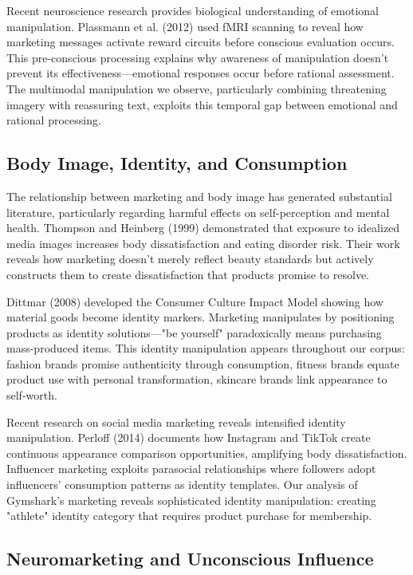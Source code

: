 Recent neuroscience research provides biological understanding of emotional manipulation. Plassmann et al. (2012) used fMRI scanning to reveal how marketing messages activate reward circuits before conscious evaluation occurs. This pre-conscious processing explains why awareness of manipulation doesn't prevent its effectiveness—emotional responses occur before rational assessment. The multimodal manipulation we observe, particularly combining threatening imagery with reassuring text, exploits this temporal gap between emotional and rational processing.

\subsection{Body Image, Identity, and Consumption}

The relationship between marketing and body image has generated substantial literature, particularly regarding harmful effects on self-perception and mental health. Thompson and Heinberg (1999) demonstrated that exposure to idealized media images increases body dissatisfaction and eating disorder risk. Their work reveals how marketing doesn't merely reflect beauty standards but actively constructs them to create dissatisfaction that products promise to resolve.

Dittmar (2008) developed the Consumer Culture Impact Model showing how material goods become identity markers. Marketing manipulates by positioning products as identity solutions—"be yourself" paradoxically means purchasing mass-produced items. This identity manipulation appears throughout our corpus: fashion brands promise authenticity through consumption, fitness brands equate product use with personal transformation, skincare brands link appearance to self-worth.

Recent research on social media marketing reveals intensified identity manipulation. Perloff (2014) documents how Instagram and TikTok create continuous appearance comparison opportunities, amplifying body dissatisfaction. Influencer marketing exploits parasocial relationships where followers adopt influencers' consumption patterns as identity templates. Our analysis of Gymshark's marketing reveals sophisticated identity manipulation: creating "athlete" identity category that requires product purchase for membership.

\subsection{Neuromarketing and Unconscious Influence}

